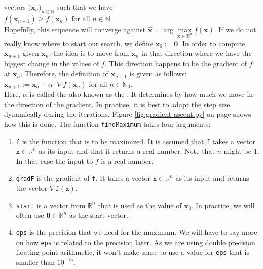 vectors $\bigl(\mathbf{x}_n\bigr)_{n\in\mathbb{N}}$ such that we have
\\[0.2cm]
\hspace*{1.3cm}
$f(\mathbf{x}_{n+1}) \geq f(\mathbf{x}_{n})$ \quad for all $n\in\mathbb{N}$.
\\[0.2cm]
Hopefully, this sequence will converge against $\widehat{\mathbf{x}} = \arg\max\limits_{\mathbf{x}\in \mathbb{R}^n}f(\mathbf{x})$.
If we do not really know where to start our search, we define $\mathbf{x}_0 := \mathbf{0}$.  In order to
compute $\mathbf{x}_{n+1}$ given $\mathbf{x}_{n}$, the idea is to move from $\mathbf{x}_n$ in that direction
where we have the biggest change in the values of $f$.   This direction happens to be the gradient of $f$ at $\mathbf{x}_n$.
Therefore, the definition of $\mathbf{x}_{n+1}$ is given as follows:
\\[0.2cm]
\hspace*{1.3cm}
$\mathbf{x}_{n+1} := \mathbf{x}_n + \alpha \cdot \nabla f(\mathbf{x}_n)$ \quad for all $n \in \mathbb{N}_0$.
\\[0.2cm]
Here, $\alpha$ is called the  also known as the .  It determines by how
much we move in the direction of the gradient.  In practise, it is best to adapt the step size dynamically
during the iterations.  Figure \ref{fig:gradient-ascent.py} on page \pageref{fig:gradient-ascent.py} shows
how this is done. 
The function \texttt{findMaximum} takes four arguments:
\begin{enumerate}
\item \texttt{f} is the function that is to be maximized.  It is assumed that \texttt{f} takes a vector
      $\texttt{x}\in \mathbb{R}^n$ as its input and that it returns a real number.  Note that $n$ might be
      $1$.  In that case the input to $f$ is a real number.
\item \texttt{gradF} is the gradient of \texttt{f}.  It takes a vector
      $\texttt{x}\in \mathbb{R}^n$ as its input and returns the vector $\nabla \mathtt{f}(\mathtt{x})$.
\item \texttt{start} is a vector from $\mathbb{R}^n$ that is used as the value of $\mathbf{x}_0$.  In
      practice, we will often use $\mathbf{0} \in \mathbb{R}^n$ as the start vector.
\item \texttt{eps} is the precision that we need for the maximum.  We will have to say more on how \texttt{eps}
      is related to the precision later.  As we are using double precision floating point arithmetic, 
      it won't make sense to use a value for \texttt{eps} that is smaller than $10^{-15}$.
\end{enumerate}
